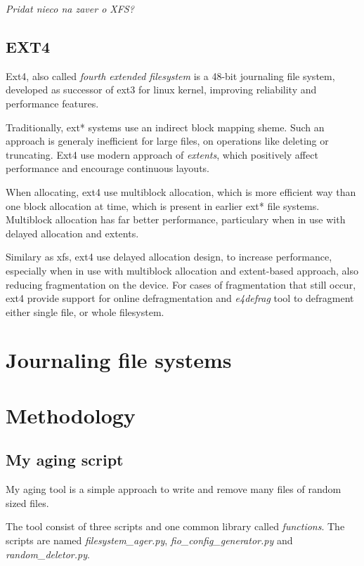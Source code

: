 \documentclass[
  color, %
  table, %
  lof,   %
  lot,   %
]{fithesis3}
\begin{document}
\textit{Pridat nieco na zaver o XFS?}

\section{EXT4}
Ext4, also called \textit{fourth extended filesystem} is a 48-bit journaling file system, developed as successor of ext3 for linux kernel, improving reliability and performance features.

Traditionally, ext* systems use an indirect block mapping sheme. Such an approach is generaly inefficient for large files, on operations like deleting or truncating. Ext4 use modern approach of \textit{extents}, which positively affect performance and encourage continuous layouts.

When allocating, ext4 use multiblock allocation, which is more efficient way than one block allocation at time, which is present in earlier ext* file systems. Multiblock allocation has far better performance, particulary when in use with delayed allocation and extents.

Similary as xfs, ext4 use delayed allocation design, to increase performance, especially when in use with multiblock allocation and extent-based approach, also reducing fragmentation on the device. For cases of fragmentation that still occur, ext4 provide support for online defragmentation and \textit{e4defrag} tool to defragment either single file, or whole filesystem.








\chapter{Journaling file systems}
\chapter{Methodology}
\section{My aging script}
My aging tool is a simple approach to write and remove many files of random sized files.

The tool consist of three scripts and one common library called \textit{functions}. The scripts are named \textit{filesystem\_ager.py}, \textit{fio\_config\_generator.py} and \textit{random\_deletor.py}.
\end{document}
